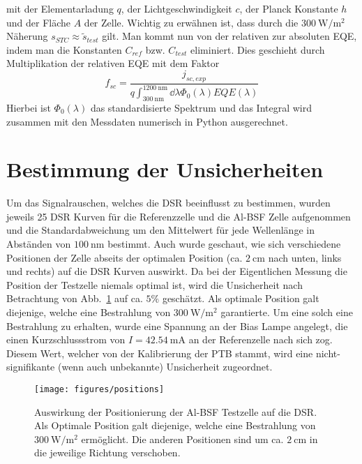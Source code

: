 \documentclass[ngerman, twocolumn]{scrartcl}
\begin{document}
mit der Elementarladung $q$, der Lichtgeschwindigkeit $c$, der Planck Konstante $h$ und der Fläche $A$ der Zelle. Wichtig zu erwähnen ist, dass durch die $\SI{300}{\watt\per\square\meter}$ Näherung $s_{STC} \approx \tilde{s}_{test}$ gilt. Man kommt nun von der relativen zur absoluten EQE, indem man die Konstanten $C_{ref}$ bzw. $C_{test}$ eliminiert. Dies geschieht durch Multiplikation der relativen EQE mit dem Faktor
\begin{equation}
f_{sc} = \frac{j_{sc,exp}}{q\int_{\SI{300}{\nano\meter}}^{\SI{1200}{\nano\meter}} \dd{\lambda} \Phi_{0}(\lambda) EQE(\lambda)}
\end{equation}
Hierbei ist $\Phi_{0}(\lambda)$ das standardisierte Spektrum und das Integral wird zusammen mit den Messdaten numerisch in Python ausgerechnet.

\section{Bestimmung der Unsicherheiten}
Um das Signalrauschen, welches die DSR beeinflusst zu bestimmen, wurden jeweils 25 DSR Kurven für die Referenzzelle und die Al-BSF Zelle aufgenommen und die Standardabweichung um den Mittelwert für jede Wellenlänge in Abständen von $\SI{100}{\nano\meter}$ bestimmt. Auch wurde geschaut, wie sich verschiedene Positionen der Zelle abseits der optimalen Position (ca. $\SI{2}{\centi\meter}$ nach unten, links und rechts) auf die DSR Kurven auswirkt. Da bei der Eigentlichen Messung die Position der Testzelle niemals optimal ist, wird die Unsicherheit nach Betrachtung von Abb.~\ref{fig:positions} auf ca. $5\%$ geschätzt. Als optimale Position galt diejenige, welche eine Bestrahlung von $\SI{300}{\watt\per\square\meter}$ garantierte. Um eine solch eine Bestrahlung zu erhalten, wurde eine Spannung an der Bias Lampe angelegt, die einen Kurzschlussstrom von $I = \SI{42.54}{\milli\ampere}$ an der Referenzelle nach sich zog. Diesem Wert, welcher von der Kalibrierung der PTB stammt, wird eine nicht-signifikante (wenn auch unbekannte) Unsicherheit zugeordnet.

\begin{figure}[h]
\texttt{[image: figures/positions]}
\caption{Auswirkung der Positionierung der Al-BSF Testzelle auf die DSR. Als Optimale Position galt diejenige, welche eine Bestrahlung von $\SI{300}{\watt\per\square\meter}$ ermöglicht. Die anderen Positionen sind um ca. $\SI{2}{\centi\meter}$ in die jeweilige Richtung verschoben.}
\label{fig:positions}
\end{figure}
\end{document}
